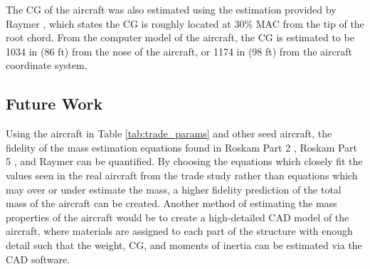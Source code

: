 The CG of the aircraft was also estimated using the estimation provided by Raymer \cite{raymer}, which states the CG is roughly located at 30\% MAC from the tip of the root chord. From the computer model of the aircraft, the CG is estimated to be 1034 in (86 ft) from the nose of the aircraft, or 1174 in (98 ft) from the aircraft coordinate system.


\subsection{Future Work}
Using the aircraft in Table \ref{tab:trade_params} and other seed aircraft, the fidelity of the mass estimation equations found in Roskam Part 2 \cite{roskam_2}, Roskam Part 5 \cite{roskam_5}, and Raymer \cite{raymer} can be quantified. By choosing the equations which closely fit the values seen in the real aircraft from the trade study rather than equations which may over or under estimate the mass, a higher fidelity prediction of the total mass of the aircraft can be created. Another method of estimating the mass properties of the aircraft would be to create a high-detailed CAD model of the aircraft, where materials are assigned to each part of the structure with enough detail such that the weight, CG, and moments of inertia can be estimated via the CAD software. 






